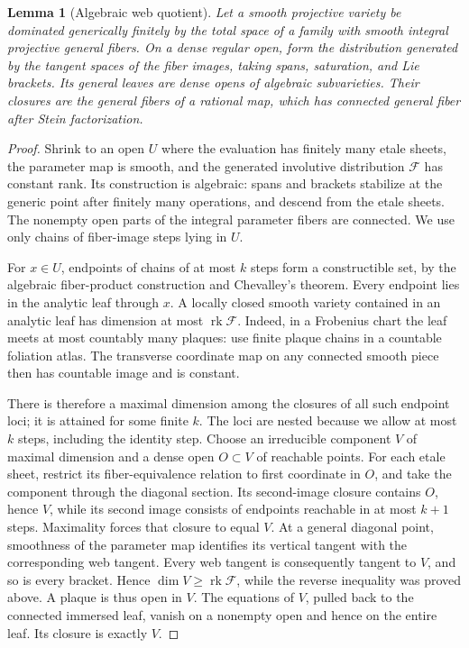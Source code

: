\documentclass[11pt,letterpaper]{article}
\newtheorem{lemma}[theorem]{Lemma}
\theoremstyle{definition}
\theoremstyle{remark}
\begin{document}
\begin{lemma}[Algebraic web quotient]\label{proj:ex:web}
Let a smooth projective variety be dominated generically finitely by
the total space of a family with smooth integral projective general
fibers. On a dense regular open, form the distribution generated by
the tangent spaces of the fiber images, taking spans, saturation,
and Lie brackets. Its general leaves are dense opens of algebraic
subvarieties. Their closures are the general fibers of a rational
map, which has connected general fiber after Stein factorization.
\end{lemma}
\begin{proof}
Shrink to an open \(U\) where the evaluation has finitely many etale
sheets, the parameter map is smooth, and the generated involutive
distribution \(\mathcal F\) has constant rank. Its construction is
algebraic: spans and brackets stabilize at the generic point after
finitely many operations, and descend from the etale sheets. The
nonempty open parts of the integral parameter fibers are connected.
We use only chains of fiber-image steps lying in \(U\).

For \(x\in U\), endpoints of chains of at most \(k\) steps form a
constructible set, by the algebraic fiber-product construction and
Chevalley's theorem. Every endpoint lies in the analytic leaf
through \(x\). A locally closed smooth variety contained in an
analytic leaf has dimension at most \(\operatorname{rk}\mathcal F\). Indeed, in a
Frobenius chart the leaf meets at most countably many plaques: use
finite plaque chains in a countable foliation atlas. The transverse
coordinate map on any connected smooth piece then has countable
image and is constant.

There is therefore a maximal dimension among the closures of all
such endpoint loci; it is attained for some finite \(k\). The loci
are nested because we allow at most \(k\) steps, including the
identity step. Choose an irreducible component \(V\) of maximal
dimension and a dense open \(O\subset V\) of reachable points.
For each etale sheet, restrict its fiber-equivalence relation to
first coordinate in \(O\), and take the component through the
diagonal section. Its second-image closure contains \(O\), hence
\(V\), while its second image consists of endpoints reachable
in at most \(k+1\) steps. Maximality forces that closure to
equal \(V\). At a general
diagonal point, smoothness of the parameter map identifies its
vertical tangent with the corresponding web tangent. Every web
tangent is consequently tangent to \(V\), and so is every bracket. Hence
\(\dim V\geq\operatorname{rk}\mathcal F\), while the reverse inequality was proved
above. A plaque is thus open in \(V\). The equations of \(V\),
pulled back to the connected immersed leaf, vanish on a nonempty
open and hence on the entire leaf. Its closure is exactly \(V\).


\end{proof}
\end{document}
